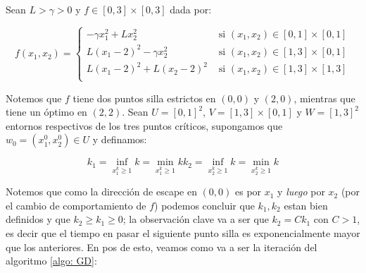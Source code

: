 \begin{remark}
	Sean $L > \gamma > 0$ y $f \in [0,3] \times [0,3]$ dada por:
	
	\begin{equation}
		f(x_1, x_2) = \left\lbrace \begin{array}{cc}
		- \gamma x_1^2 + Lx_2^2 & \text{ si } (x_1,x_2) \in [0,1] \times [0,1] \\
		L \left(x_1 - 2\right)^2 - \gamma x_2^2 & \text{ si } (x_1,x_2) \in [1,3] \times [0,1] \\
		L \left(x_1 - 2\right)^2 + L \left(x_2 - 2\right)^2 & \text{ si } (x_1,x_2) \in [1,3] \times [1,3] \\
		\end{array} \right.
	\end{equation}
	
	Notemos que $f$ tiene dos puntos silla estrictos en $(0,0)$ y $(2,0)$, mientras que tiene un \'optimo en $(2,2)$. Sean $U = [0,1]^2$, $V= [1,3] \times [0,1]$ y $W = [1,3]^2$ entornos respectivos de los tres puntos cr\'iticos, supongamos que $w_0 = \left(x^0_1, x^0_2\right) \in U$ y definamos:
	
	\begin{subequations}
		\begin{equation*}
			k_1 = \inf\limits_{x^k_1 \geq 1}{k} = \min\limits_{x^k_1 \geq 1}{k}
		\end{equation*}
		\begin{equation*}
		k_2 = \inf\limits_{x^k_2 \geq 1}{k} = \min\limits_{x^k_2 \geq 1}{k}
		\end{equation*}
	\end{subequations}
	
	Notemos que como la direcci\'on de escape en $(0,0)$ es por $x_1$ y \textit{luego} por $x_2$ (por el cambio de comportamiento de $f$) podemos concluir que $k_1,k_2$ estan bien definidos y que $k_2 \geq k_1 \geq 0$; la observaci\'on clave va a ser que $k_2 = Ck_1$ con $C>1$, es decir que el tiempo en pasar el siguiente punto silla es exponencialmente mayor que los anteriores. En pos de esto, veamos como va a ser la iteraci\'on del algoritmo \ref{algo: GD}:
	

\end{remark}

